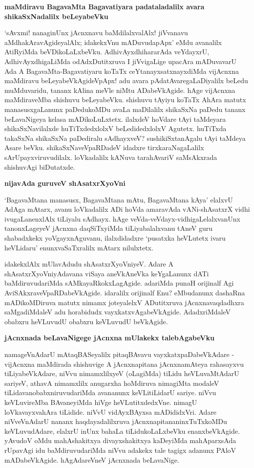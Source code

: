 {\bigskip
\noindent
{\large\bf maMdiravu BagavaMta Bagavatiyara padataladalilx avara shikaSxNadalilx beLeyabeVku}}\label{page67a}
\medskip

\noindent
`sAvxmi! nanaginUnx jAcnxnavu baMdilalxvalAlx! jiVvanavu aMdhakAravAgideyalAlx; idakekxVnu mADuvudapApx' eMdu avanalilx AtiRyiMda beVDikoLaLxbeVku. AdhivAyxdhihararAda veYdayxrU, AdhivAyxdhigaLiMda odAdxDutitxruva I jiVvigaLige upacAra mADuvavarU Ada A BagavaMta-Bagavatiyaru koTaTx ceYtanayxsatxnayxdiMda vijAcnxna maMdiravu beLeyabeVkAgideVpApx! adu avara pAdatAvaregaLaDiyalilx beLedu muMduvaridu, tananx kAlina meVle niMtu ADabeVkAgide. hAge vijAcnxna maMdiraveMba shishuvu beLeyabeVku. shishuvu tAyiyu koTaTx AhAra matutx manasusxgaLanunx paDedukoMDu avaLa maDilalilx shikaSxNa paDedu tananx beLavaNigeya kelasa mADikoLuLxtetx. ilalxdeV hoVdare tAyi taMdeyara shikaSxNavilalxde huTiTxdedxlolxV beLedidedxlolxV Agutetx. huTiTxda takaSxNa shikaSxNa paDediralu sAdhayxveV? sushikiSxtanAgalu tAyi taMdeya Asare beVku. shikaSxNaveVpaRDadeV idadxre tirxkaraNagaLalilx sArUpayxviruvudilalx. loVkadalilx kANuva tarahAvariV saMsAkxrada shishuvAgi biDutatxde.

{\bigskip
\noindent
{\large\bf nijavAda guruveV shAsatxrXyoVni}}\label{page68}
\medskip

\noindent
`BagavaMtana manasusx, BagavaMtana mAtu, BagavaMtana kAya' elalxvU AdAga mAtarx, avanu loVkadalilx ADi hoVda amaravAda vANi-shAsatxrX vidhi ivugaLanenxlAlx tiLiyalu sAdhayx. hAge veVda-veVdayx-vidhigaLelalxvanUnx tanonxLageyeV jAcnxna daqSiTxyiMda tiLiyabalalxvanu tAneV guru shabadxkekx yoVgayxnAguvanu, ilalxdidadxre `pusatxka heVLutetx ivaru heVLidaru' enunxvaSaTxralilx mAtarx nilulxtetx.

idakekxlAlx mUlavAdudu shAsatxrXyoVniyeV. Adare A shAsatxrXyoVniyAdavana viSaya aneVkAneVka keYgaLanunx dATi baMdiruvudariMda sAMkayaRkokxLagAgide. adariMda punaH orijinalf Agi AviSAkxraveVpaRDabeVkAgide. idaralilx orijinalf Enu? eMbudanunx dashaRna mADikoMDiruva matutx nimamx joteyalelxV ADutitxruva jAcnxnavaqdadhxra saMgadiMdaleV adu horabidudx vayxkatxvAgabeVkAgide. AdadxriMdaleV obabxru heVLuvudU obabxru keVLuvudU beVkAgide.

{\bigskip
\noindent
{\large\bf jAcnxnada beLavaNigege jAcnxna mUlakekx talebAgabeVku}}
\medskip

\noindent
namageVnAdarU mAtaqBASeyalilx pitaqBAvavu vayxkatxpaDabeVkAdare - vijAcnxna maMdirada shishuvige A jAcnxnapitana jAcnxnamAteya rahasayxvu tiLiyabeVkAdare, niVvu nimamxlilxyeV (oLagiMda) tiLidu heVLuvaMtAdarU sariyeV, athavA nimamxlilx anugarxha hoMdiruva nimagiMta modaleV tiLidavanobabxniruvudariMda avananunx keVLitiLidarU sariye. niVvu keVLuvireMba BAvaneyiMda hiVge heVLutitxdedxVne. nimagU loVkavayxvahAra tiLidide. niVvU vidAyxBAyxsa mADididxVri. Adare niVveVnAdarU nananx haqdayadalilxruva jAcnxnapitananinxTuTxkoMDu keVLuvudAdare, elalxrU inUnx bahaLa tiLidukoLaLxbeVku enanxbeVkAgide. yAvudoV oMdu mahAshakitxya divayxshakitxya kaDeyiMda mahAparxsAda rUpavAgi idu baMdiruvudariMda niVvu adakekx tale tagigx adanunx PAloV mADabeVkAgide. hAgAdareVneV jAcnxnada beLavaNige.


